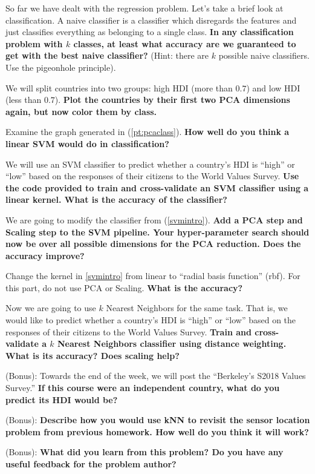 \documentclass[preview]{standalone}
\begin{document}
\begin{Parts}
\Part So far we have dealt with the regression problem. Let's take a brief look at classification. A naive classifier is a classifier which disregards the features and just classifies everything as belonging to a single class. \textbf{In any classification problem with $k$ classes, at least what accuracy are we guaranteed to get with the best naive classifier?} (Hint: there are $k$ possible naive classifiers. Use the pigeonhole principle).




\Part \label{pt:pcaclass} We will split countries into two groups: high HDI (more than $0.7$) and low HDI (less than $0.7$). \textbf{Plot the countries by their first two PCA dimensions again, but now color them by class.}




\Part Examine the graph generated in (\ref{pt:pcaclass}). \textbf{How well do you think a linear SVM would do in classification?}




\Part \label{svmintro} We will use an SVM classifier to predict whether a country's HDI is ``high'' or ``low'' based on the responses of their citizens to the World Values Survey. \textbf{Use the code provided to train and cross-validate an SVM classifier using a linear kernel. What is the accuracy of the classifier?}




\Part We are going to modify the classifier from (\ref{svmintro}). \textbf{Add a PCA step and Scaling step to the SVM pipeline. Your hyper-parameter search should now be over all possible dimensions for the PCA reduction. Does the accuracy improve?}




\Part Change the kernel in \ref{svmintro} from linear to ``radial basis function'' (rbf). For this part, do not use PCA or Scaling. \textbf{What is the accuracy?}




\Part Now we are going to use $k$ Nearest Neighbors for the same task. That is, we would like to predict whether a country's HDI is ``high'' or ``low'' based on the responses of their citizens to the World Values Survey. \textbf{Train and cross-validate a $k$ Nearest Neighbors classifier using distance weighting. What is its accuracy? Does scaling help?}




\Part (Bonus): Towards the end of the week, we will post the ``Berkeley's S2018 Values Survey.'' \textbf{If this course were an independent country, what do you predict its HDI would be?}



\Part (Bonus): \textbf{Describe how you would use kNN to revisit the sensor location problem from previous homework. How well do you think it will work?}



\Part (Bonus): \textbf{What did you learn from this problem? Do you have any useful feedback for the problem author?}



\end{Parts}
\end{document}
